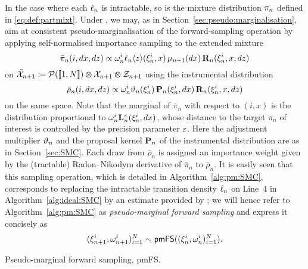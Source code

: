 In the case where each $\ell_{n}$ is intractable, so is the mixture distribution $\pi_n$ defined in \eqref{eq:def:partmixt}. Under , we may, as in Section~\ref{sec:pseudo:marginalisation}, aim at consistent pseudo-marginalisation of the forward-sampling operation by applying self-normalised importance sampling to the extended mixture  
$$
\bar{\pi}_n(i, d x, d z)
\propto \omega_{n}^{i} \ell_{n} \langle z \rangle(\xi_{n}^{i}, x) \, \mu_{n + 1}(d x) \, \mathbf{R}_{n}(\xi_{n}^{i}, x, d z) 
$$
on $\bar{\mathcal{X}}_{n + 1} \coloneqq \mathcal{P}(\llbracket 1, N \rrbracket) \varotimes \mathcal{X}_{n + 1} \varotimes \mathcal{Z}_{n + 1}$ using the instrumental distribution  
$$
\bar{\rho}_n(i, d x, d z) \propto \omega_{n}^{i} \vartheta_{n}(\xi_{n}^{i}) \, \mathbf{P}_{n}(\xi_{n}^{i}, d x) \, \mathbf{R}_{n}(\xi_{n}^{i}, x, d z)
$$
on the same space. Note that the marginal of $\bar{\pi}_n$ with respect to $(i, x)$ is the distribution proportional to $\omega_{n}^{i} \mathbf{L}_{n}^\varepsilon(\xi_{n}^{i}, d x)$, whose distance to the target $\pi_n$ of interest is controlled by the precision parameter $\varepsilon$. Here the adjustment multiplier $\vartheta_{n}$ and the proposal kernel $\mathbf{P}_{n}$ of the instrumental distribution are as in Section~\ref{sec:SMC}. Each draw from $\bar{\rho}_n$ is assigned an importance weight given by the (tractable) Radon--Nikodym derivative of $\bar{\pi}_n$ to $\bar{\rho}_n$. It is easily seen that this sampling operation, which is detailed in Algorithm~\ref{alg:pm:SMC}, corresponds to replacing the intractable transition density $\ell_{n}$ on Line~4 in Algorithm~\ref{alg:ideal:SMC} by an estimate provided by ; we will hence refer to Algorithm~\ref{alg:pm:SMC} as \emph{pseudo-marginal forward sampling} and express it concisely as 
$$
    (\xi_{n + 1}^{i}, \omega_{n + 1}^{i})_{i = 1}^N \sim \mathsf{pmFS}((\xi_{n}^{i}, \omega_{n}^{i})_{i = 1}^N). 
$$

\begin{algorithm}[h] 
\caption{Pseudo-marginal forward sampling, \textsf{pmFS}.} \label{alg:pm:SMC}
\end{algorithm}

